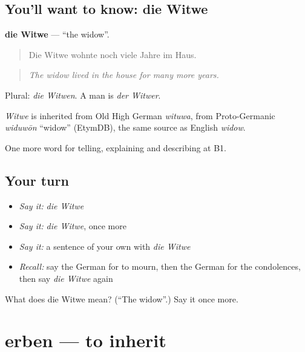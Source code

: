 \subsection*{You'll want to know: die Witwe}
\textbf{die Witwe} — \textquotedblleft{}the widow\textquotedblright{}.

\begin{quote}
Die Witwe wohnte noch viele Jahre im Haus.
\end{quote}

\begin{quote}
\emph{The widow lived in the house for many more years.}
\end{quote}

Plural: \emph{die Witwen}. A man is \emph{der Witwer}.

\begin{cousinweb}
\emph{Witwe} is inherited from Old High German \emph{wituwa}, from Proto-Germanic \emph{widuwōn} \textquotedblleft{}widow\textquotedblright{} (EtymDB), the same source as English \emph{widow}.
\end{cousinweb}

\begin{grammarlens}[title={What you've built}]
One more word for telling, explaining and describing at B1.
\end{grammarlens}

\subsection*{Your turn}
\begin{itemize}
\raggedright
  \item \emph{Say it:} \emph{die Witwe}
  \item \emph{Say it:} \emph{die Witwe}, once more
  \item \emph{Say it:} a sentence of your own with \emph{die Witwe}
  \item \emph{Recall:} say the German for to mourn, then the German for the condolences, then say \emph{die Witwe} again
\end{itemize}

\begin{tcolorbox}[breakable,colback=teal!4,colframe=teal!35!black,title={Before you move on}]
What does die Witwe mean? (\textquotedblleft{}The widow\textquotedblright{}.) Say it once more.
\end{tcolorbox}
\section[erben]{erben — to inherit}

